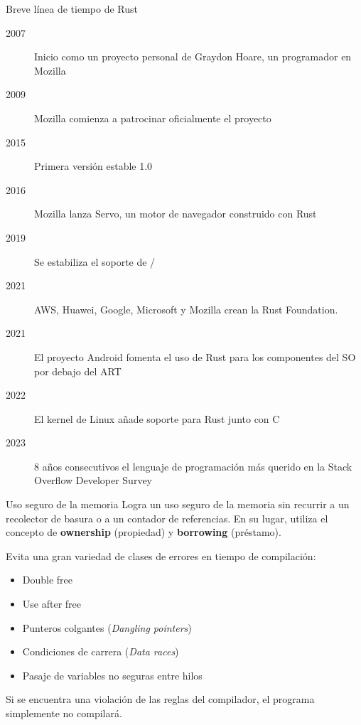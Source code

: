 \documentclass{beamer}
\begin{document}
\begin{frame}{Breve línea de tiempo de Rust}
  \begin{description}
    \item [2007] Inicio como un proyecto personal de Graydon Hoare, un programador en Mozilla
    \item [2009] Mozilla comienza a patrocinar oficialmente el proyecto
    \item [2015] Primera versión estable 1.0
    \item [2016] Mozilla lanza Servo, un motor de navegador construido con Rust
    \item [2019] Se estabiliza el soporte de /
    \item [2021] AWS, Huawei, Google, Microsoft y Mozilla crean la Rust Foundation.
    \item [2021] El proyecto Android fomenta el uso de Rust para los componentes del SO por debajo del ART
    \item [2022] El kernel de Linux añade soporte para Rust junto con C
    \item [2023] 8 años consecutivos el lenguaje de programación más querido en la Stack Overflow Developer Survey
  \end{description}
\end{frame}

\begin{frame}{Uso seguro de la memoria}
  Logra un uso seguro de la memoria sin recurrir a un recolector de basura o a un contador de referencias.
  En su lugar, utiliza el concepto de \textbf{ownership} (propiedad) y \textbf{borrowing} (préstamo).

  \vfill

  Evita una gran variedad de clases de errores en tiempo de compilación:

  \begin{itemize}
    \item Double free
    \item Use after free
    \item Punteros colgantes (\emph{Dangling pointers})
    \item Condiciones de carrera (\emph{Data races})
    \item Pasaje de variables no seguras entre hilos
  \end{itemize}

  \vfill

  Si se encuentra una violación de las reglas del compilador, el programa simplemente no compilará.
\end{frame}
\end{document}
